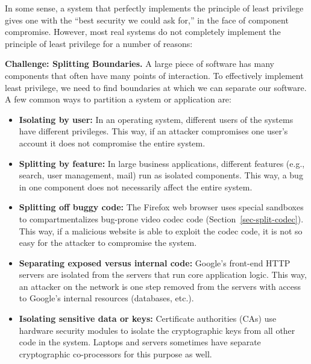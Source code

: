 \documentclass[
  letterpaper,
]{scrbook}
\theoremstyle{definition}
\theoremstyle{plain}
\theoremstyle{plain}
\theoremstyle{remark}
\begin{document}
In some sense, a system that perfectly implements the principle of least
privilege gives one with the ``best security we could ask for,'' in the
face of component compromise. However, most real systems do not
completely implement the principle of least privilege for a number of
reasons:


\textbf{Challenge: Splitting Boundaries.} A large piece of software has
many components that often have many points of interaction. To
effectively implement least privilege, we need to find boundaries at
which we can separate our software. A few common ways to partition a
system or application are:


\begin{itemize}
\item
  \textbf{Isolating by user:} In an operating system, different users of
  the systems have different privileges. This way, if an attacker
  compromises one user's account it does not compromise the entire
  system.
\item
  \textbf{Splitting by feature:} In large business applications,
  different features (e.g., search, user management, mail) run as
  isolated components. This way, a bug in one component does not
  necessarily affect the entire system.
\item
  \textbf{Splitting off buggy code:} The Firefox web browser uses
  special sandboxes to compartmentalizes bug-prone video codec code
  (Section~\ref{sec-split-codec}). This way, if a malicious website is
  able to exploit the codec code, it is not so easy for the attacker to
  compromise the system.
\item
  \textbf{Separating exposed versus internal code:} Google's front-end
  HTTP servers are isolated from the servers that run core application
  logic. This way, an attacker on the network is one step removed from
  the servers with access to Google's internal resources (databases,
  etc.).
\item
  \textbf{Isolating sensitive data or keys:} Certificate authorities
  (CAs) use hardware security modules to isolate the cryptographic keys
  from all other code in the system. Laptops and servers sometimes have
  separate cryptographic co-processors for this purpose as well.
\end{itemize}
\end{document}
